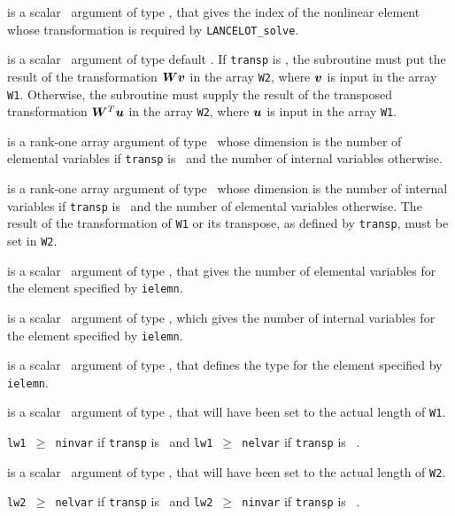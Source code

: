 \documentclass{galahad}
\newcommand{\fullpackagename}{LANC\-E\-LOT}
\newcommand{\solver}{{\tt \fullpackagename\_solve}}
\begin{document}
\begin{description}

 is a scalar \intentin\ argument of type \integer,
that gives the index of the nonlinear element whose transformation is
required by \solver.

 is a scalar \intentin\ argument of type default \logical.
If {\tt transp} is \false, the subroutine must put the result of the
transformation ${\bm{W}} {\bm{v}}$ in the array {\tt W2}, where ${\bm{v}}$ is input in the
array {\tt W1}. Otherwise, the subroutine must supply the result of the
transposed transformation ${\bm{W}}^T {\bm{u}}$
in the array {\tt W2}, where ${\bm{u}}$ is input in the array {\tt W1}.

 is a rank-one \intentin array argument of type \realdp\,
whose dimension is the number of elemental variables
if {\tt transp} is \false\
and the number of internal variables otherwise.

 is a rank-one \intentout array argument of type \realdp\,
whose dimension is
the number of internal variables if {\tt transp} is
\false\ and the number of elemental variables otherwise.
The result of the transformation of {\tt W1} or its transpose, as
defined by {\tt transp}, must be set in {\tt W2}.

 is a scalar \intentin\ argument of type \integer,
that gives the number of elemental variables for the element specified
by {\tt ielemn}.

 is a scalar \intentin\ argument of type \integer,
which gives the number of internal variables for the element specified
by {\tt ielemn}.

 is a scalar \intentin\ argument of type \integer,
that defines the type for the element specified
by {\tt ielemn}.

 is a scalar \intentin\ argument of type \integer,
that will have been set to the actual length of {\tt W1}.

\restriction
{\tt lw1 $\geq$ ninvar} if {\tt transp} is \true\ and
{\tt lw1 $\geq$ nelvar} if {\tt transp} is \false\ .

 is a scalar \intentin\ argument of type \integer,
that will have been set to the actual length of {\tt W2}.

\restriction
{\tt lw2 $\geq$ nelvar} if {\tt transp} is \true\ and
{\tt lw2 $\geq$ ninvar} if {\tt transp} is \false\ .

\end{description}
\end{document}
